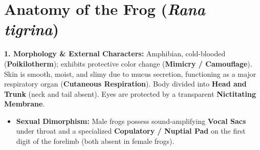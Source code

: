 \documentclass[10pt,twoside,openright]{book}
\begin{document}
\section{Anatomy of the Frog (\textit{Rana tigrina})}

\begin{conceptbox}
\textbf{1. Morphology \& External Characters:}
Amphibian, cold-blooded (\textbf{Poikilotherm}); exhibits protective color change (\textbf{Mimicry / Camouflage}). Skin is smooth, moist, and slimy due to mucus secretion, functioning as a major respiratory organ (\textbf{Cutaneous Respiration}). Body divided into \textbf{Head and Trunk} (neck and tail absent). Eyes are protected by a transparent \textbf{Nictitating Membrane}.
\begin{itemize}
  \item \textbf{Sexual Dimorphism:} Male frogs possess sound-amplifying \textbf{Vocal Sacs} under throat and a specialized \textbf{Copulatory / Nuptial Pad} on the first digit of the forelimb (both absent in female frogs).
\end{itemize}


\end{conceptbox}
\end{document}
